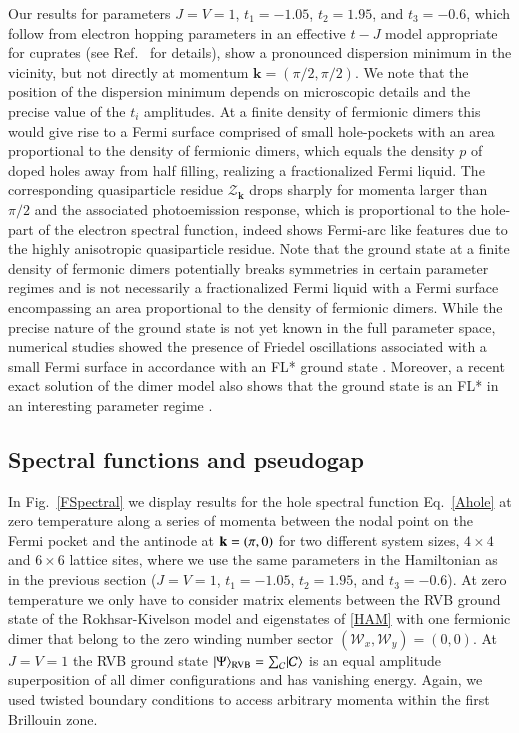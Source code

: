 \documentclass[aps,pra,reprint,showpacs,superscriptaddress]{revtex4-1}
\DeclarePairedDelimiter\ket{\lvert}{\rangle}
\begin{document}
Our results for parameters $J=V=1$, $t_1=-1.05$, $t_2=1.95$, and $t_3=-0.6$, which follow from electron hopping parameters in an effective $t-J$ model appropriate for cuprates (see Ref.~\cite{punk2015quantum} for details), show a pronounced dispersion minimum in the vicinity, but not directly at momentum $\mathbf{k}=(\pi/2,\pi/2)$. We note that the position of the dispersion minimum depends on microscopic details and the precise value of the $t_i$ amplitudes. At a finite density of fermionic dimers this would give rise to a Fermi surface comprised of small hole-pockets with an area proportional to the density of fermionic dimers, which equals the density $p$ of doped holes away from half filling, realizing a fractionalized Fermi liquid. The corresponding quasiparticle residue $\mathcal{Z}_\mathbf{k}$ drops sharply for momenta larger than $\pi/2$ and the associated photoemission response, which is proportional to the hole-part of the electron spectral function, indeed shows Fermi-arc like features due to the highly anisotropic quasiparticle residue. Note that the ground state at a finite density of fermonic dimers potentially breaks symmetries in certain parameter regimes and is not necessarily a fractionalized Fermi liquid with a Fermi surface encompassing an area proportional to the density of fermionic dimers. While the precise nature of the ground state is not yet known in the full parameter space, numerical studies showed the presence of Friedel oscillations associated with a small Fermi surface in accordance with an FL* ground state \cite{lee2016electronic}. Moreover, a recent exact solution of the dimer model also shows that the ground state is an FL* in an interesting parameter regime \cite{feldmeier2017exact}.

\subsection{Spectral functions and pseudogap}\label{PG1}

In Fig.~\ref{FSpectral} we display results for the hole spectral function Eq.~\eqref{Ahole} at zero temperature along a series of momenta between the nodal point on the Fermi pocket and the antinode at $\bold{k}=(\pi,0)$ for two different system sizes, $4\times4$ and $6\times6$ lattice sites, where we use the same parameters in the Hamiltonian as in the previous section ($J=V=1$, $t_1=-1.05$, $t_2=1.95$, and $t_3=-0.6$). At zero temperature we only have to consider matrix elements between the RVB ground state of the Rokhsar-Kivelson model and eigenstates of \eqref{HAM} with one fermionic dimer that belong to the zero winding number sector $(\mathcal{W}_{x},\mathcal{W}_{y})=(0,0)$. At $J=V=1$ the RVB ground state 
$\ket{\Psi}_{\text{RVB}}=\sum_{\mathcal{C}}\ket{\mathcal{C}}$
is an equal amplitude superposition of all dimer configurations and has vanishing energy. 
Again, we used twisted boundary conditions to access arbitrary momenta within the first Brillouin zone.
\end{document}
